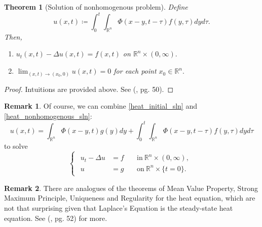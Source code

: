 \documentclass[openany, amssymb, psamsfonts]{amsart}
\newtheorem{thm}{Theorem}[section]
\theoremstyle{definition}
\newtheorem{rem}{Remark}[section]
\numberwithin{equation}{section}
\newcommand{\bbr}{\mathbb{R}}
\begin{document}
\begin{thm} [Solution of nonhomogenous problem] Define
\begin{equation} \label{heat_nonhomogenous_sln}
    u(x, t) \coloneqq \int_{0}^{t} \int_{\bbr^n} \Phi(x-y, t - \tau) f(y, \tau) dy d\tau.
\end{equation}
Then,
\begin{enumerate}
    \item $u_t(x, t) - \Delta u(x, t) = f(x, t)$ on $\bbr^n \times (0, \infty).$
    \item $\lim_{(x, t) \to (x_0, 0)} u(x, t) = 0$ for each point $x_0 \in \bbr^n.$
\end{enumerate}
\end{thm}
\begin{proof}
    Intuitions are provided above. See (\cite{Evans}, pg. 50).
\end{proof}

\begin{rem}
Of course, we can combine \eqref{heat_initial_sln} and \eqref{heat_nonhomogenous_sln}:
\begin{equation}
u(x, t) = \int_{\bbr^n} \Phi(x- y, t) g(y) dy + \int_{0}^{t} \int_{\bbr^n} \Phi(x - y, t - \tau) f(y, \tau) dy d\tau
\end{equation}
to solve \begin{equation}
    \begin{cases}
    \begin{aligned}
        u_t - \Delta u &= f && \:\text{in}\: \bbr^n \times (0, \infty) ,\\
        u &= g && \:\text{on}\: \bbr^n \times \{t = 0\} .
    \end{aligned}
    \end{cases}
\end{equation}
\end{rem}
\begin{rem}
There are analogues of the theorems of Mean Value Property, Strong Maximum Principle, Uniqueness and Regularity for the heat equation, which are not that surprising given that Laplace's Equation is the steady-state heat equation. See (\cite{Evans}, pg. 52) for more.
\end{rem}
\end{document}
